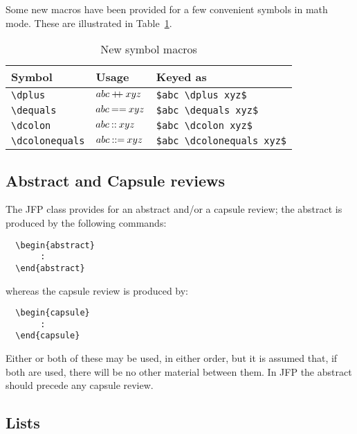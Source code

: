 \documentclass{jfp}
\begin{document}
Some new macros have been provided for a few convenient symbols in
math mode.  These are illustrated in Table~\ref{newcommands}.
\ifprodtf\newpage\fi

\begin{table}
\caption{New symbol macros}\label{newcommands}
\programmath
\begin{tabular}{lll}
\hline\hline
Symbol                & Usage                  & Keyed as\\
\hline
\verb"\dplus"         & $abc \mathbin{+\!\!+} xyz$         & \verb"$abc \dplus xyz$"\\
\verb"\dequals"       & $abc \mathbin{==} xyz$       & \verb"$abc \dequals xyz$"\\
\verb"\dcolon"        & $abc \mathbin{::} xyz$        & \verb"$abc \dcolon xyz$"\\
\verb"\dcolonequals"  & $abc \mathbin{::=} xyz$  & \verb"$abc \dcolonequals xyz$"\\
\hline\hline
\end{tabular}
\unprogrammath
\end{table}

\subsection{Abstract and Capsule reviews}

The JFP class provides for an abstract and/or a capsule review; the
abstract is produced by the following commands:
%
\begin{verbatim}
  \begin{abstract}
       :
  \end{abstract}
\end{verbatim}
%
whereas the capsule review is produced by:
%
\begin{verbatim}
  \begin{capsule}
       :
  \end{capsule}
\end{verbatim}
%
Either or both of these may be used, in either order, but it is assumed
that, if both are used, there will be no other material between them.
In JFP the abstract should precede any capsule review.

\subsection{Lists}
\end{document}
